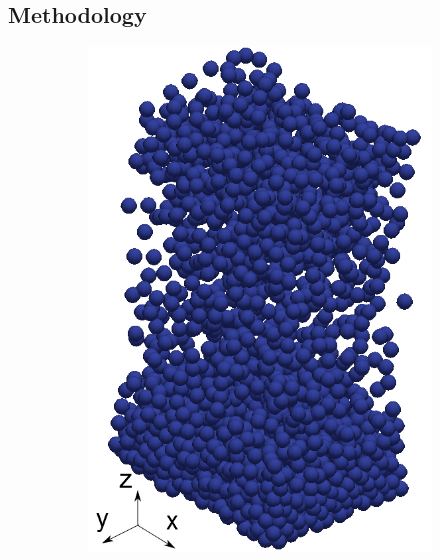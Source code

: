 \subsection{Methodology}
\label{method}
\begin{figure}[t]
	\centering
	\begin{subfigure}{0.4\textwidth}
		\centering
		\includegraphics[width=\textwidth]{chapters/figures/fill01.png}
	\end{subfigure}
	\begin{subfigure}{0.4\textwidth}
		\centering

\end{subfigure}
\end{figure}
